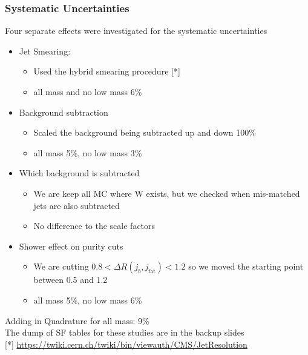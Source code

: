 \documentclass{beamer}
\begin{document}
\begin{frame}
  \frametitle{Systematic Uncertainties}
 Four separate effects were investigated for the systematic uncertainties
  \begin{itemize}
  \item Jet Smearing: 
    \begin{itemize}
    \item Used the hybrid smearing procedure [*] \\
    \item all mass and no low mass 6\%
    \end{itemize}
  \item Background subtraction
    \begin{itemize}
    \item Scaled the background being subtracted up and down 100\%
    \item all mass 5\%, no low mass 3\%
    \end{itemize}
  \item Which background is subtracted
    \begin{itemize}
      \item We are keep all MC where W exists, but we checked when mis-matched jets
        are also subtracted
      \item No difference to the scale factors
    \end{itemize}
  \item Shower effect on purity cuts
    \begin{itemize}
      \item We are cutting $0.8 < \Delta R(j_b,j_\text{fat}) < 1.2$
        so we moved the starting point between 0.5 and 1.2
      \item all mass 5\%, no low mass 6\%
    \end{itemize}
  \end{itemize}
  Adding in Quadrature for all mass: 9\% \\
  The dump of SF tables for these studies are in the backup slides \\
  \vspace{12pt}
  {\small [*] 
    \href{https://twiki.cern.ch/twiki/bin/viewauth/CMS/JetResolution#Smearing_procedures}
         {https://twiki.cern.ch/twiki/bin/viewauth/CMS/JetResolution}}
\end{frame}
\end{document}
